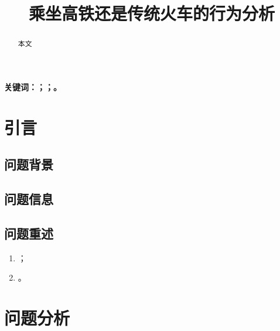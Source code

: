 \documentclass{ctexart}
\newcounter{sub}
\begin{document}

\title{\textbf{乘坐高铁还是传统火车的行为分析}}
\author{}
\date{}
\maketitle

\renewcommand{\abstractname}{\Large 摘要}
\begin{abstract}
	本文
\end{abstract}

\textbf{关键词：；；。}

\newpage



\tableofcontents

\newpage

\listoffigures

\newpage

\listoftables

\newpage

\setcounter{section}{-1}


\section{引言}%
\label{sec:引言}

\subsection{问题背景}%
\label{sub:问题背景}

\cite{巩慧琴2012高铁时代下旅客交通工具选择行为研究}
\subsection{问题信息}%
\label{sub:问题信息}

\subsection{问题重述}%
\label{sub:问题重述}



\begin{enumerate}
	\item ；
	\item 。
\end{enumerate}

\newpage

\section{问题分析}%
\label{sec:问题分析}
\end{document}
